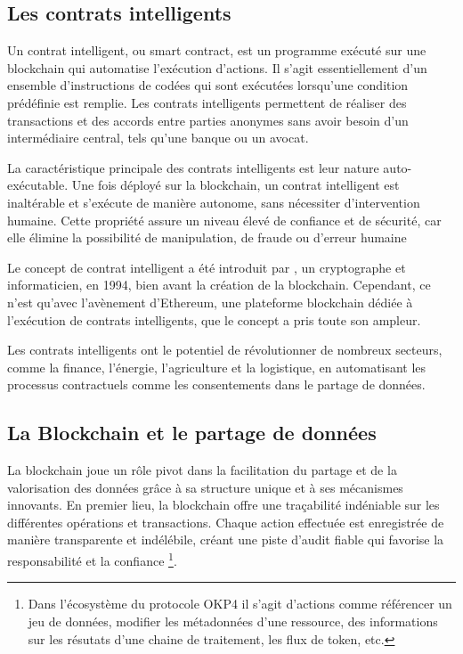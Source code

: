\subsection{Les contrats intelligents}\label{subsec:smart_contracts}


Un contrat intelligent, ou smart contract, est un programme exécuté sur une blockchain qui automatise l'exécution d'actions. Il s'agit essentiellement d'un ensemble d'instructions de codées qui sont exécutées lorsqu'une condition prédéfinie est remplie. Les contrats intelligents permettent de réaliser des transactions et des accords entre parties anonymes sans avoir besoin d'un intermédiaire central, tels qu'une banque ou un avocat.

La caractéristique principale des contrats intelligents est leur nature auto-exécutable. Une fois déployé sur la blockchain, un contrat intelligent est inaltérable et s'exécute de manière autonome, sans nécessiter d'intervention humaine. Cette propriété assure un niveau élevé de confiance et de sécurité, car elle élimine la possibilité de manipulation, de fraude ou d'erreur humaine

Le concept de contrat intelligent a été introduit par \citeauthor{nick_szabo_idea_1997}, un cryptographe et informaticien, en 1994, bien avant la création de la blockchain. Cependant, ce n'est qu'avec l'avènement d'Ethereum, une plateforme blockchain dédiée à l'exécution de contrats intelligents, que le concept a pris toute son ampleur.

Les contrats intelligents ont le potentiel de révolutionner de nombreux secteurs, comme la finance, l'énergie, l'agriculture et la logistique, en automatisant les processus contractuels comme les consentements dans le partage de données.


\subsection{La Blockchain et le partage de données} \label{subsec:bc_partage}


La blockchain joue un rôle pivot dans la facilitation du partage et de la valorisation des données grâce à sa structure unique et à ses mécanismes innovants. En premier lieu, la blockchain offre une traçabilité indéniable sur les différentes opérations et transactions. Chaque action effectuée est enregistrée de manière transparente et indélébile, créant une piste d'audit fiable qui favorise la responsabilité et la confiance \footnote{Dans l'écosystème du protocole OKP4 il s'agit d'actions comme référencer un jeu de données, modifier les métadonnées d'une ressource, des informations sur les résutats d'une chaine de traitement, les flux de token, etc.}.

